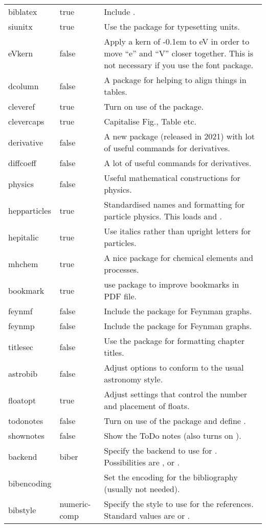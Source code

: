 \begin{xtabular}{llp{10.0cm}}
  biblatex & true & Include .\\
  siunitx & true & Use the  package for typesetting units.\\
  eVkern & false & Apply a kern of -0.1em to \si{\eV} in order to move \enquote{e} and \enquote{V} closer together.
  This is not necessary if you use the  font package.\\
  dcolumn & false & A package for helping to align things in tables.\\
  cleveref & true & Turn on use of the  package.\\
  clevercaps & true & Capitalise Fig., Table etc.\\
  derivative & false & A new package (released in 2021) with lot of useful commands for derivatives.\\
  diffcoeff & false & A lot of useful commands for derivatives.\\ 
  physics & false & Useful mathematical constructions for physics.\\
  hepparticles & true & Standardised names and formatting for particle physics.
    This loads  and .\\
  hepitalic & true & Use italics rather than upright letters for particles.\\
  mhchem & true & A nice package for chemical elements and processes.\\
  bookmark & true & use  package to improve bookmarks in PDF file.\\
  feynmf & false & Include the  package for Feynman graphs.\\
  feynmp & false & Include the  package for Feynman graphs.\\
  titlesec & false & Use the  package for formatting chapter titles.\\
  astrobib & false & Adjust  options to conform to the usual astronomy style.\\
  floatopt & true & Adjust settings that control the number and placement of floats.\\
  todonotes & false & Turn on use of the  package and define .\\
  shownotes & false & Show the ToDo notes (also turns on ).\\
  backend & biber & Specify the backend to use for .
    Possibilities are ,  or .\\
  bibencoding & & Set the encoding for the bibliography (usually not needed).\\
  bibstyle & numeric-comp & Specify the style to use for the references.
    Standard values are  or .\\
\end{xtabular}

